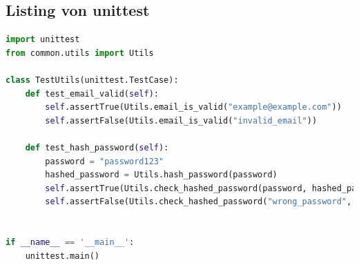 \documentclass[a4paper,12pt]{article}
\begin{document}
\clearpage
\subsection{Listing von unittest}
\label{sec:unittest}

\begin{lstlisting}[language=Python, caption=Implementation der Utils-Tests, label=lst:utilstest]
import unittest
from common.utils import Utils

class TestUtils(unittest.TestCase):
    def test_email_valid(self):
        self.assertTrue(Utils.email_is_valid("example@example.com"))
        self.assertFalse(Utils.email_is_valid("invalid_email"))

    def test_hash_password(self):
        password = "password123"
        hashed_password = Utils.hash_password(password)
        self.assertTrue(Utils.check_hashed_password(password, hashed_password))
        self.assertFalse(Utils.check_hashed_password("wrong_password", hashed_password))


if __name__ == '__main__':
    unittest.main()
\end{lstlisting}
\end{document}
